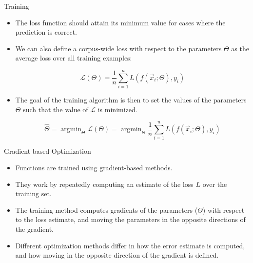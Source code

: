\documentclass[handout]{beamer}
\begin{document}
\begin{frame}{Training}
\begin{scriptsize}
\begin{itemize}
\item The loss function should attain its minimum value for cases where the prediction is correct.

\item We can also define a corpus-wide loss with respect to the parameters $\Theta$ as the average loss over all training examples:

\begin{displaymath}
 \mathcal{L}(\Theta) = \frac{1}{n} \sum_{i=1}^n L(f(\vec{x}_i;\Theta), y_i)
\end{displaymath}

\item The goal of the training algorithm is then to set the values of the parameters $\Theta$  such that the value of $\mathcal{L}$ is minimized.


\begin{displaymath}
 \hat{\Theta} = \operatorname{argmin}_{\Theta} \mathcal{L}(\Theta) =  \operatorname{argmin}_{\Theta} \frac{1}{n} \sum_{i=1}^n L(f(\vec{x}_i;\Theta), y_i)
\end{displaymath}


\end{itemize}


\end{scriptsize}
\end{frame}



\begin{frame}{Gradient-based Optimization}
\begin{scriptsize}
\begin{itemize}
\item Functions are trained using  gradient-based methods.

\item They work by repeatedly computing an estimate of the loss $L$ over the training set.



\item The training method computes gradients of the parameters ($\Theta$)  with respect to the loss estimate, and moving the parameters in the opposite directions of the gradient. 

\item Different optimization methods differ in how the error estimate is computed, and how moving in the opposite direction of the gradient is defined.

\end{itemize}


\end{scriptsize}
\end{frame}
\end{document}
